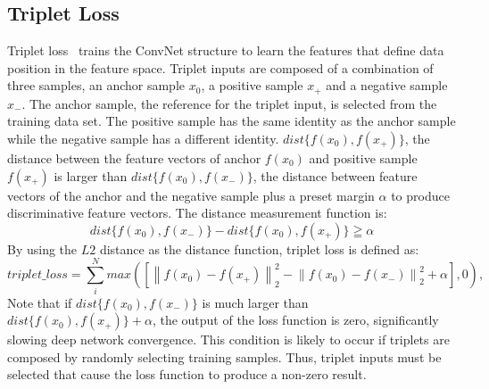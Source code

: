 \subsection{Triplet Loss}
Triplet loss~\cite{hoffer2015deep} trains the ConvNet structure to learn the features that define data position in the feature space.
Triplet inputs are composed of a combination of three samples, an anchor sample $x_0$, a positive sample $x_+$ and a negative sample $x_-$. The anchor sample, the reference for the triplet input, is selected from the training data set. The positive sample has the same identity as the anchor sample while the negative sample has a different identity.
$dist\{f(x_0),f(x_+)\}$, the distance between the feature vectors of anchor $f(x_0)$ and positive sample $f(x_+)$ is larger than $dist\{f(x_0),f(x_-)\}$, the distance between feature vectors of the anchor and the negative sample plus a preset margin $\alpha$ to produce discriminative feature vectors. 
The distance measurement function is:
\begin{equation}
    dist\{f(x_0),f(x_-)\} - dist\{f(x_0),f(x_+)\} \geqq \alpha
    \label{triplet_condition}
\end{equation}
By using the $L2$ distance as the distance function, triplet loss is defined as:
\begin{equation}
    triplet\_loss = \sum_i^N max\left({ \left[ {\left\| {{f(x_0)} - {f(x_+)}} \right\|_2^2} - {\left\| {{f(x_0)} - {f(x_-)}} \right\|_2^2}  + \alpha \right]},0 \right),
    \label{triplet_loss}
\end{equation}
Note that if $dist\{f(x_0),f(x_-)\}$ is much larger than $dist\{f(x_0),f(x_+)\} + \alpha$, the output of the loss function is zero, significantly slowing deep network convergence. This condition is likely to occur if triplets are composed by randomly selecting training samples. Thus, triplet inputs must be selected that cause the loss function to produce a non-zero result.

